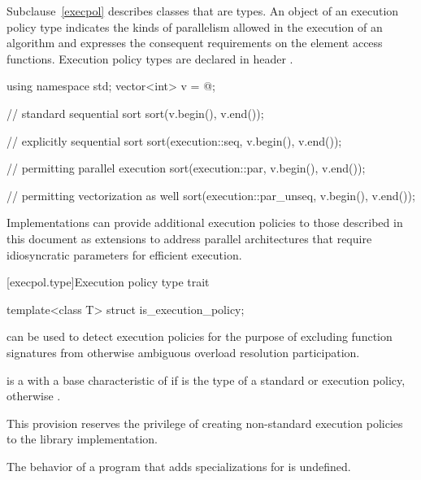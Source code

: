 \pnum
Subclause~\ref{execpol} describes classes that are  types. An
object of an execution policy type indicates the kinds of parallelism allowed
in the execution of an algorithm and expresses the consequent requirements on
the element access functions.
Execution policy types are declared in header .
\begin{example}
\begin{codeblock}
using namespace std;
vector<int> v = @\commentellip@;

// standard sequential sort
sort(v.begin(), v.end());

// explicitly sequential sort
sort(execution::seq, v.begin(), v.end());

// permitting parallel execution
sort(execution::par, v.begin(), v.end());

// permitting vectorization as well
sort(execution::par_unseq, v.begin(), v.end());
\end{codeblock}
\end{example}
\begin{note}
Implementations can provide additional execution policies
to those described in this document as extensions
to address parallel architectures that require idiosyncratic
parameters for efficient execution.
\end{note}

[execpol.type]{Execution policy type trait}

%
\begin{itemdecl}
template<class T> struct is_execution_policy;
\end{itemdecl}

\begin{itemdescr}
\pnum
{} can be used to detect execution policies for the
purpose of excluding function signatures from otherwise ambiguous overload
resolution participation.

\pnum
{} is a  with a
base characteristic of  if  is the type of a standard
or 
execution policy, otherwise .

\begin{note}
This provision reserves the privilege of creating non-standard execution
policies to the library implementation.
\end{note}

\pnum
The behavior of a program that adds specializations for
 is undefined.
\end{itemdescr}

